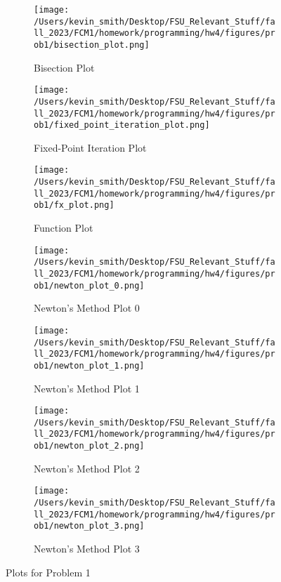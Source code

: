 \documentclass[12pt, letterpaper]{article}
\begin{document}
\begin{figure}[htbp]
    \centering

    \begin{subfigure}{0.45\textwidth}
        \texttt{[image: /Users/kevin\_smith/Desktop/FSU\_Relevant\_Stuff/fall\_2023/FCM1/homework/programming/hw4/figures/prob1/bisection\_plot.png]}
        \caption{Bisection Plot}
        \label{fig:prob1_bisection}
    \end{subfigure}
    \hfill
    \begin{subfigure}{0.45\textwidth}
        \texttt{[image: /Users/kevin\_smith/Desktop/FSU\_Relevant\_Stuff/fall\_2023/FCM1/homework/programming/hw4/figures/prob1/fixed\_point\_iteration\_plot.png]}
        \caption{Fixed-Point Iteration Plot}
        \label{fig:prob1_fixed_point_iteration}
    \end{subfigure}

    \begin{subfigure}{0.45\textwidth}
        \texttt{[image: /Users/kevin\_smith/Desktop/FSU\_Relevant\_Stuff/fall\_2023/FCM1/homework/programming/hw4/figures/prob1/fx\_plot.png]}
        \caption{Function Plot}
        \label{fig:prob1_fx_plot}
    \end{subfigure}
    \hfill
    \begin{subfigure}{0.45\textwidth}
        \texttt{[image: /Users/kevin\_smith/Desktop/FSU\_Relevant\_Stuff/fall\_2023/FCM1/homework/programming/hw4/figures/prob1/newton\_plot\_0.png]}
        \caption{Newton's Method Plot 0}
        \label{fig:prob1_newton_0}
    \end{subfigure}

    \begin{subfigure}{0.45\textwidth}
        \texttt{[image: /Users/kevin\_smith/Desktop/FSU\_Relevant\_Stuff/fall\_2023/FCM1/homework/programming/hw4/figures/prob1/newton\_plot\_1.png]}
        \caption{Newton's Method Plot 1}
        \label{fig:prob1_newton_1}
    \end{subfigure}
    \hfill
    \begin{subfigure}{0.45\textwidth}
        \texttt{[image: /Users/kevin\_smith/Desktop/FSU\_Relevant\_Stuff/fall\_2023/FCM1/homework/programming/hw4/figures/prob1/newton\_plot\_2.png]}
        \caption{Newton's Method Plot 2}
        \label{fig:prob1_newton_2}
    \end{subfigure}

    \begin{subfigure}{0.45\textwidth}
        \texttt{[image: /Users/kevin\_smith/Desktop/FSU\_Relevant\_Stuff/fall\_2023/FCM1/homework/programming/hw4/figures/prob1/newton\_plot\_3.png]}
        \caption{Newton's Method Plot 3}
        \label{fig:prob1_newton_3}
    \end{subfigure}

    \caption{Plots for Problem 1}
    \label{fig:prob1_plots}
\end{figure}
\end{document}
